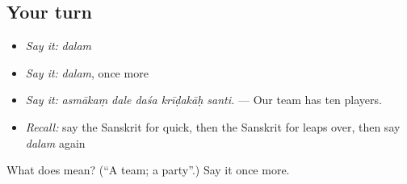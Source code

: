 \subsection*{Your turn}
\begin{itemize}
\raggedright
  \item \emph{Say it:} \emph{dalam}
  \item \emph{Say it:} \emph{dalam}, once more
  \item \emph{Say it:} \emph{asmākaṃ dale daśa krīḍakāḥ santi.} — Our team has ten players.
  \item \emph{Recall:} say the Sanskrit for quick, then the Sanskrit for leaps over, then say \emph{dalam} again
\end{itemize}

\begin{tcolorbox}[breakable,colback=teal!4,colframe=teal!35!black,title={Before you move on}]
What does  mean? (\textquotedblleft{}A team; a party\textquotedblright{}.) Say it once more.
\end{tcolorbox}
